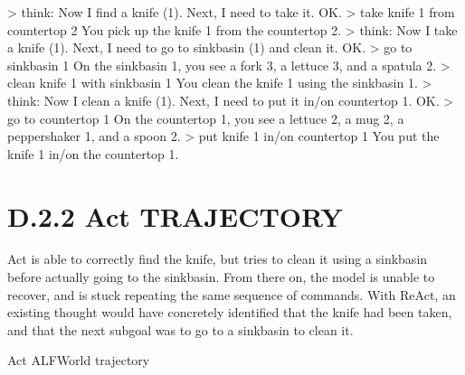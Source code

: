 \documentclass[
]{article}
\newenvironment{Shaded}{}{}
\newcommand{\NormalTok}[1]{#1}
\begin{document}
\begin{Shaded}
\begin{Highlighting}[]
\NormalTok{\textgreater{} think: Now I find a knife (1). Next, I need to take it.}
\NormalTok{OK.}
\NormalTok{\textgreater{} take knife 1 from countertop 2}
\NormalTok{You pick up the knife 1 from the countertop 2.}
\NormalTok{\textgreater{} think: Now I take a knife (1). Next, I need to go to sinkbasin (1) and clean it.}
\NormalTok{OK.}
\NormalTok{\textgreater{} go to sinkbasin 1}
\NormalTok{On the sinkbasin 1, you see a fork 3, a lettuce 3, and a spatula 2.}
\NormalTok{\textgreater{} clean knife 1 with sinkbasin 1}
\NormalTok{You clean the knife 1 using the sinkbasin 1.}
\NormalTok{\textgreater{} think: Now I clean a knife (1). Next, I need to put it in/on countertop 1.}
\NormalTok{OK.}
\NormalTok{\textgreater{} go to countertop 1}
\NormalTok{On the countertop 1, you see a lettuce 2, a mug 2, a peppershaker 1, and a spoon 2.}
\NormalTok{\textgreater{} put knife 1 in/on countertop 1}
\NormalTok{You put the knife 1 in/on the countertop 1. }
\end{Highlighting}
\end{Shaded}

\section{D.2.2 Act TRAJECTORY}\label{d.2.2-act-trajectory}

Act is able to correctly find the knife, but tries to clean it using a
sinkbasin before actually going to the sinkbasin. From there on, the
model is unable to recover, and is stuck repeating the same sequence of
commands. With ReAct, an existing thought would have concretely
identified that the knife had been taken, and that the next subgoal was
to go to a sinkbasin to clean it.

Act ALFWorld trajectory
\end{document}

